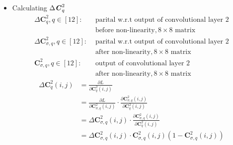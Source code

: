 \documentclass[12pt]{article}
\begin{document}
\begin{itemize}
\item Calculating $\Delta \textbf{\textit{C}}_{q}^2$
\begin{align*}
    \Delta \bm{C}_{q}^2, q \in [12]:& \text{ parital w.r.t output of convolutional layer 2} \\& \text{ before non-linearity}, 8 \times 8 \text{ matrix}\\
    \Delta \bm{C}_{\sigma, q}^2, q \in [12]:& \text{ parital w.r.t output of convolutional layer 2} \\& \text{ after non-linearity}, 8 \times 8 \text{ matrix}\\
    \bm{C}_{\sigma, q}^2, q \in [12]:& \text{ output of convolutional layer 2} \\& \text{ after non-linearity}, 8 \times 8 \text{ matrix}
\end{align*}
\begin{align*}
    \Delta \bm{C}_{q}^2(i, j)
    &= \frac{\partial L}{\partial \bm{C}_{q}^2(i, j)}\\
    &= \frac{\partial L}{\partial \bm{C}_{\sigma, q}^2(i, j)}
    \cdot
    \frac{\partial \bm{C}_{\sigma, q}^2(i, j)}{\partial \bm{C}_{q}^2(i, j)}\\
    &= \Delta \bm{C}_{\sigma, q}^2(i, j)
    \cdot
    \frac{\partial \bm{C}_{\sigma, q}^2(i, j)}{\partial \bm{C}_{q}^2(i, j)}\\
    &= \Delta \bm{C}_{\sigma, q}^2(i, j)
    \cdot
    \bm{C}_{\sigma, q}^2(i, j)\left(1 - \bm{C}_{\sigma, q}^2(i, j)\right)
\end{align*}


\end{itemize}
\end{document}
